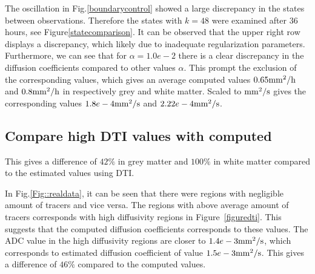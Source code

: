 \documentclass[11pt,a4paper]{article}
\begin{document}
The oscillation in Fig.\ref{boundarycontrol} showed a large discrepancy in the states between observations. Therefore the states with $k=48$ were examined after 36 hours, see Figure\ref{statecomparison}. It can be observed that the upper right row displays a discrepancy, which likely due to inadequate regularization parameters. Furthermore, we can see that for $\alpha=1.0e-2$ there is a clear discrepancy in the diffusion coefficients compared to other values $\alpha$. This prompt the exclusion of the corresponding values, which gives an average computed values $ 0.65 \mathrm{mm\sp{2}/h}$ and  $ 0.8 \mathrm{mm\sp{2}/h}$ in respectively grey and white matter. Scaled to $\mathrm{mm\sp{2}/s}$ gives the corresponding values $1.8e-4\mathrm{mm\sp{2}/s}$ and $2.22e-4 \mathrm{mm\sp{2}/s}$. 

\subsection*{Compare high DTI values with computed}
This gives a difference of $42 \%$ in grey matter and $ 100 \%$ in white matter compared to the estimated values using DTI.

In Fig.\ref{Fig::realdata}, it can be seen that there were regions with negligible amount of tracers and vice versa. The regions with above average amount of tracers corresponds with high diffusivity regions in Figure~\ref{figuredti}. This suggests that the computed diffusion coefficients corresponds to these values. The ADC value in the high diffusivity regions are closer to  $1.4e-3 \mathrm{mm\sp{2}/s}$, which corresponds to estimated diffusion coefficient of value $1.5e-3 \mathrm{mm\sp{2}/s}$. This gives a difference of $ 46 \%$ compared to the computed values. 


















\end{document}
